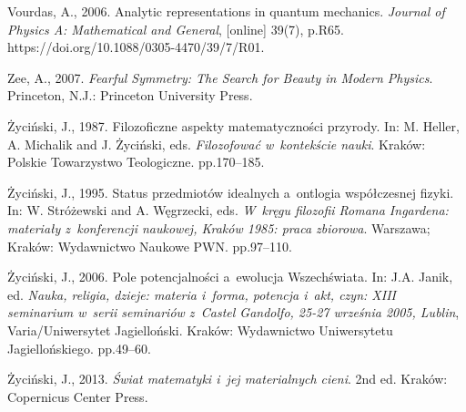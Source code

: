 Vourdas, A., 2006. Analytic representations in quantum mechanics. \textit{Journal of Physics A: Mathematical and General}, [online] 39(7), p.R65. https://doi.org/10.1088/0305-4470/39/7/R01.



Zee, A., 2007. \textit{Fearful Symmetry: The Search for Beauty in Modern Physics}. Princeton, N.J.: Princeton University Press.



Życiński, J., 1987. Filozoficzne aspekty matematyczności przyrody. In: M. Heller, A. Michalik and J. Życiński, eds. \textit{Filozofować w~kontekście nauki}. Kraków: Polskie Towarzystwo Teologiczne. pp.170–185.



Życiński, J., 1995. Status przedmiotów idealnych a~ontlogia współczesnej fizyki. In: W. Stróżewski and A. Węgrzecki, eds. \textit{W~kręgu filozofii Romana Ingardena: materiały z~konferencji naukowej, Kraków 1985: praca zbiorowa}. Warszawa; Kraków: Wydawnictwo Naukowe PWN. pp.97–110.



Życiński, J., 2006. Pole potencjalności a~ewolucja Wszechświata. In: J.A. Janik, ed. \textit{Nauka, religia, dzieje: materia i~forma, potencja i~akt, czyn: XIII seminarium w~serii seminariów z~Castel Gandolfo, 25-27 września 2005, Lublin}, Varia/Uniwersytet Jagielloński. Kraków: Wydawnictwo Uniwersytetu Jagiellońskiego. pp.49–60.



Życiński, J., 2013. \textit{Świat matematyki i~jej materialnych cieni}. 2nd ed. Kraków: Copernicus Center Press.



